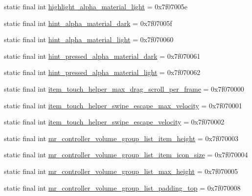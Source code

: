 \begin{CompactItemize}
\item 
static final int \hyperlink{classcom_1_1companyname_1_1x__2doo_1_1_r_1_1dimen_91967a610c6aa4b669662f834c16d7a5}{highlight\_\-alpha\_\-material\_\-light} = 0x7f07005e
\item 
static final int \hyperlink{classcom_1_1companyname_1_1x__2doo_1_1_r_1_1dimen_5b5de26686a707576a73cfb086a61160}{hint\_\-alpha\_\-material\_\-dark} = 0x7f07005f
\item 
static final int \hyperlink{classcom_1_1companyname_1_1x__2doo_1_1_r_1_1dimen_9179fdc9dd1e8047b4729d6dee32338f}{hint\_\-alpha\_\-material\_\-light} = 0x7f070060
\item 
static final int \hyperlink{classcom_1_1companyname_1_1x__2doo_1_1_r_1_1dimen_f08e71f6c8f07c2b3ada5c5e07aaea4a}{hint\_\-pressed\_\-alpha\_\-material\_\-dark} = 0x7f070061
\item 
static final int \hyperlink{classcom_1_1companyname_1_1x__2doo_1_1_r_1_1dimen_9d60f1a0e1e577569b9fc91e88e106c1}{hint\_\-pressed\_\-alpha\_\-material\_\-light} = 0x7f070062
\item 
static final int \hyperlink{classcom_1_1companyname_1_1x__2doo_1_1_r_1_1dimen_52abe50422879348737cd46ec7bffb28}{item\_\-touch\_\-helper\_\-max\_\-drag\_\-scroll\_\-per\_\-frame} = 0x7f070000
\item 
static final int \hyperlink{classcom_1_1companyname_1_1x__2doo_1_1_r_1_1dimen_3a0553de8777921bb726eead30dca790}{item\_\-touch\_\-helper\_\-swipe\_\-escape\_\-max\_\-velocity} = 0x7f070001
\item 
static final int \hyperlink{classcom_1_1companyname_1_1x__2doo_1_1_r_1_1dimen_8cadde3ee3d23cbbb19649af4c548ce7}{item\_\-touch\_\-helper\_\-swipe\_\-escape\_\-velocity} = 0x7f070002
\item 
static final int \hyperlink{classcom_1_1companyname_1_1x__2doo_1_1_r_1_1dimen_91abfa5783894ae838959ffd0ce86cfc}{mr\_\-controller\_\-volume\_\-group\_\-list\_\-item\_\-height} = 0x7f070003
\item 
static final int \hyperlink{classcom_1_1companyname_1_1x__2doo_1_1_r_1_1dimen_f71534c1cec2e6a08bc8b75094c68989}{mr\_\-controller\_\-volume\_\-group\_\-list\_\-item\_\-icon\_\-size} = 0x7f070004
\item 
static final int \hyperlink{classcom_1_1companyname_1_1x__2doo_1_1_r_1_1dimen_3a9ebcea6b86a97634ff40304a8d38d9}{mr\_\-controller\_\-volume\_\-group\_\-list\_\-max\_\-height} = 0x7f070005
\item 
static final int \hyperlink{classcom_1_1companyname_1_1x__2doo_1_1_r_1_1dimen_38da5814a08d5cc89227bd01983d1645}{mr\_\-controller\_\-volume\_\-group\_\-list\_\-padding\_\-top} = 0x7f070008

\end{CompactItemize}
